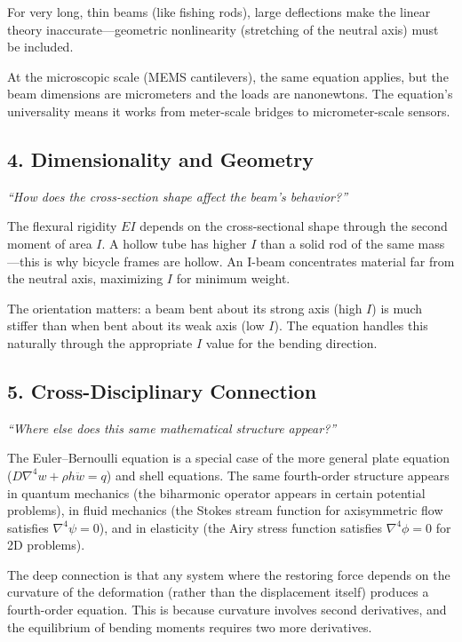 \documentclass[11pt,openright]{book}
\begin{document}
For very long, thin beams (like fishing rods), large deflections make the linear theory inaccurate---geometric nonlinearity (stretching of the neutral axis) must be included.

At the microscopic scale (MEMS cantilevers), the same equation applies, but the beam dimensions are micrometers and the loads are nanonewtons. The equation's universality means it works from meter-scale bridges to micrometer-scale sensors.

\subsection*{4. Dimensionality and Geometry}
\textit{``How does the cross-section shape affect the beam's behavior?''}

The flexural rigidity $EI$ depends on the cross-sectional shape through the second moment of area $I$. A hollow tube has higher $I$ than a solid rod of the same mass---this is why bicycle frames are hollow. An I-beam concentrates material far from the neutral axis, maximizing $I$ for minimum weight.

The orientation matters: a beam bent about its strong axis (high $I$) is much stiffer than when bent about its weak axis (low $I$). The equation handles this naturally through the appropriate $I$ value for the bending direction.

\subsection*{5. Cross-Disciplinary Connection}
\textit{``Where else does this same mathematical structure appear?''}

The Euler--Bernoulli equation is a special case of the more general plate equation ($D\nabla^4 w + \rho h \ddot{w} = q$) and shell equations. The same fourth-order structure appears in quantum mechanics (the biharmonic operator appears in certain potential problems), in fluid mechanics (the Stokes stream function for axisymmetric flow satisfies $\nabla^4 \psi = 0$), and in elasticity (the Airy stress function satisfies $\nabla^4 \phi = 0$ for 2D problems).

The deep connection is that any system where the restoring force depends on the curvature of the deformation (rather than the displacement itself) produces a fourth-order equation. This is because curvature involves second derivatives, and the equilibrium of bending moments requires two more derivatives.


\end{document}
